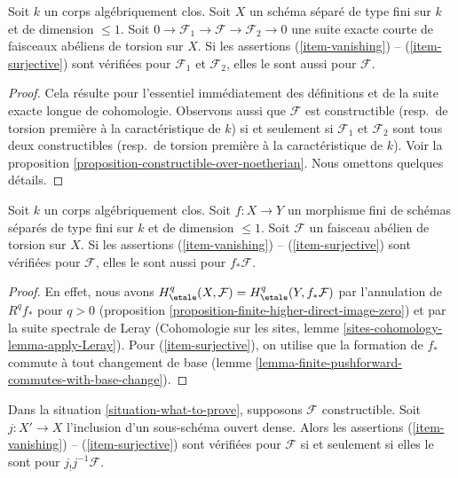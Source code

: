 \begin{lemma}
\label{lemma-ses-statements}
Soit $k$ un corps algébriquement clos. Soit $X$ un schéma séparé de type
fini sur $k$ et de dimension $\leq 1$. Soit
$0 \to \mathcal{F}_1 \to \mathcal{F} \to \mathcal{F}_2 \to 0$
une suite exacte courte de faisceaux abéliens de torsion sur $X$.
Si les assertions (\ref{item-vanishing}) -- (\ref{item-surjective}) sont vérifiées
pour $\mathcal{F}_1$ et $\mathcal{F}_2$, elles le sont aussi
pour $\mathcal{F}$.
\end{lemma}

\begin{proof}
Cela résulte pour l'essentiel immédiatement des définitions et de la suite exacte longue
de cohomologie. Observons aussi que $\mathcal{F}$ est constructible
(resp.\ de torsion première à la caractéristique de $k$) si et seulement si
$\mathcal{F}_1$ et $\mathcal{F}_2$ sont tous deux constructibles
(resp.\ de torsion première à la caractéristique de $k$). Voir la
proposition \ref{proposition-constructible-over-noetherian}.
Nous omettons quelques détails.
\end{proof}

\begin{lemma}
\label{lemma-finite-pushforward-statements}
Soit $k$ un corps algébriquement clos. Soit $f : X \to Y$ un
morphisme fini de schémas séparés de type fini sur $k$ et de
dimension $\leq 1$. Soit $\mathcal{F}$ un faisceau abélien de torsion sur $X$.
Si les assertions (\ref{item-vanishing}) -- (\ref{item-surjective}) sont vérifiées
pour $\mathcal{F}$, elles le sont aussi pour $f_*\mathcal{F}$.
\end{lemma}

\begin{proof}
En effet, nous avons $H^q_\etale(X, \mathcal{F}) = H^q_\etale(Y, f_*\mathcal{F})$
par l'annulation de $R^qf_*$ pour $q > 0$
(proposition \ref{proposition-finite-higher-direct-image-zero}) et par
la suite spectrale de Leray
(Cohomologie sur les sites, lemme \ref{sites-cohomology-lemma-apply-Leray}).
Pour (\ref{item-surjective}), on utilise que la formation de $f_*$ commute à
tout changement de base
(lemme \ref{lemma-finite-pushforward-commutes-with-base-change}).
\end{proof}

\begin{lemma}
\label{lemma-restrict-to-open}
Dans la situation \ref{situation-what-to-prove}, supposons $\mathcal{F}$
constructible. Soit $j : X' \to X$ l'inclusion d'un sous-schéma ouvert dense.
Alors les assertions
(\ref{item-vanishing}) -- (\ref{item-surjective}) sont vérifiées pour $\mathcal{F}$
si et seulement si elles le sont pour $j_!j^{-1}\mathcal{F}$.
\end{lemma}

